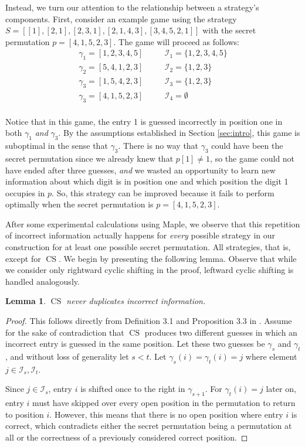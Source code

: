 \documentclass[article]{amsart}
\theoremstyle{plain}
\newtheorem{lemma}[theorem]{Lemma}
\DeclareMathOperator{\CS}{CS}
\begin{document}
Instead, we turn our attention to the relationship between a strategy's components. %
First, consider an example game using the strategy $S = [[1], [2, 1], [2, 3, 1],[2, 1, 4, 3], [3, 4, 5, 2, 1]]$ with the secret permutation $p = [4,1,5,2,3]$. The game will proceed as follows:
\[\begin{array}{lll}
   \gamma_1 = [1,2,3,4,5] & \quad & \mathcal{I}_1 = \{1,2,3,4,5\} \\ 
   \gamma_2 = [5,4,1,2,3] & & \mathcal{I}_2 = \{1,2,3\} \\ 
   \gamma_3 = [1,5,4,2,3] & & \mathcal{I}_3 = \{1,2,3\} \\ 
   \gamma_3 = [4,1,5,2,3] & & \mathcal{I}_4 = \emptyset \\ 
\end{array}\]

Notice that in this game, the entry 1 is guessed incorrectly in position one in both $\gamma_1$ \textit{and} $\gamma_3$. By the assumptions established in Section \ref{sec:intro}, this game is suboptimal in the sense that $\gamma_3$. There is no way that $\gamma_3$ could have been the secret permutation since we already knew that $p[1] \neq 1$, so the game could not have ended after three guesses, \textit{and} we wasted an opportunity to learn new information about which digit is in position one and which position the digit 1 occupies in $p$. So, this strategy can be improved because it fails to perform optimally when the secret permutation is $p = [4,1,5,2,3]$. 

After some experimental calculations using Maple, we observe that this repetition of incorrect information actually happens for \textit{every} possible strategy in our construction for at least one possible secret permutation. All strategies, that is, except for $\CS$. We begin by presenting the following lemma. Observe that while we consider only rightward cyclic shifting in the proof, leftward cyclic shifting is handled analogously.

\begin{lemma} \label{lem:nodupes}
    $\CS$ never duplicates incorrect information.
\end{lemma}

\begin{proof}
    This follows directly from Definition 3.1 and Proposition 3.3 in \cite{kutin2024}. Assume for the sake of contradiction that $\CS$ produces two different guesses in which an incorrect entry is guessed in the same position. Let these two guesses be $\gamma_s$ and $\gamma_t$, and without loss of generality let $s < t$. Let $\gamma_s(i) = \gamma_t(i) = j$ where element $j \in \mathcal{I}_s, \mathcal{I}_t$.

    Since $j \in \mathcal{I}_s$, entry $i$ is shifted once to the right in $\gamma_{s+1}$. For $\gamma_t(i) = j$ later on, entry $i$ must have skipped over every open position in the permutation to return to position $i$. However, this means that there is no open position where entry $i$ is correct, which contradicts either the secret permutation being a permutation at all or the correctness of a previously considered correct position.    
\end{proof}
\end{document}
